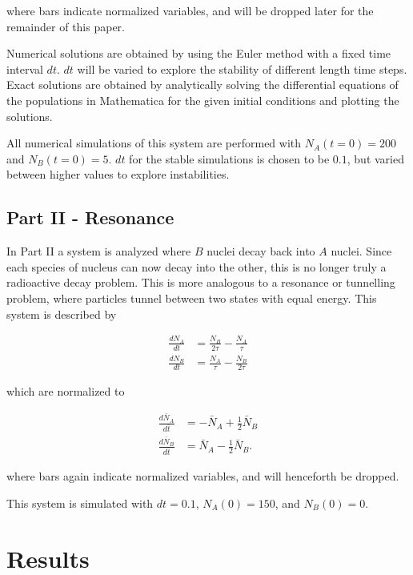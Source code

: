 \documentclass[pra,twocolumn,showpacs,amsmath,amssymb]{revtex4-1}
\begin{document}
where bars indicate normalized variables, and will be dropped later for the remainder
of this paper.

Numerical solutions are obtained by using the Euler method with a fixed time
interval $dt$. $dt$ will be varied to explore the stability of different length
time steps. Exact solutions are obtained by analytically solving the differential
equations of the populations in Mathematica for the given initial conditions
and plotting the solutions.

All numerical simulations of this system are performed with
$N_A (t=0) = 200$ and $N_B (t=0) = 5$. $dt$ for the stable simulations is chosen
to be $0.1$, but varied between higher values to explore instabilities.

\subsection{Part II - Resonance}

In Part II a system is analyzed where $B$ nuclei decay back into $A$ nuclei.
Since each species of nucleus can now decay into the other, this is no longer
truly a radioactive decay problem. This is more analogous to a resonance or
tunnelling problem, where particles tunnel between two states with equal energy.\cite{assignment}
This system is described by

\begin{align}
  \frac{d N_A}{dt} &= \frac{N_B}{2 \tau} - \frac{N_A}{\tau} \\
  \frac{d N_B}{dt} &= \frac{N_A}{\tau} - \frac{N_B}{2 \tau}
\end{align}

which are normalized to

\begin{align}
  \frac{d \bar N_A}{d \bar t} &= -  \bar N_A + \frac{1}{2} \bar N_B \label{eq:res_A_norm} \\
  \frac{d \bar N_B}{d \bar t} &=  \bar N_A - \frac{1}{2} \bar N_B \label{eq:res_B_norm}.
\end{align}

where bars again indicate normalized variables, and will henceforth be dropped.

This system is simulated with $dt=0.1$, $N_A(0)=150$, and $N_B(0)=0$.



\section{Results}
\end{document}
